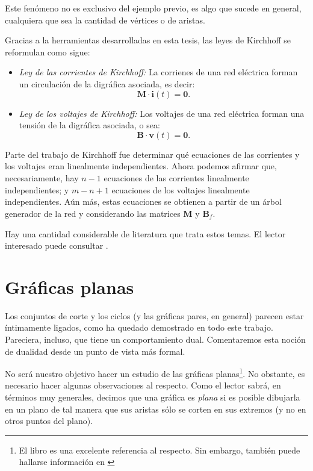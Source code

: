 Este fenómeno no es exclusivo del ejemplo previo, es algo que sucede en general, cualquiera que sea la cantidad de vértices o de aristas.

Gracias a la herramientas desarrolladas en esta tesis, las leyes de Kirchhoff se reformulan como sigue:

\begin{itemize}
    \item \textit{Ley de las corrientes de Kirchhoff:} La corrienes de una red eléctrica forman un circulación de la digráfica asociada, es decir: $$
    \mathbf{M}\cdot\mathbf{i}(t) = \mathbf{0}.$$
    
    \item \textit{Ley de los voltajes de Kirchhoff:} Los voltajes de una red eléctrica forman una tensión de la digráfica asociada, o sea: $$
    \mathbf{B}\cdot\mathbf{v}(t) = \mathbf{0}.$$
\end{itemize}


Parte del trabajo de Kirchhoff fue determinar qué ecuaciones de las corrientes y los voltajes eran linealmente independientes. Ahora podemos afirmar que, necesariamente, hay $n-1$ ecuaciones de las corrientes linealmente independientes; y $m -n +1$ ecuaciones de los voltajes linealmente independientes. Aún más, estas ecuaciones se obtienen a partir de un árbol generador de la red y considerando las matrices $\widehat{\mathbf{M}}$ y $\mathbf{B}_{f}$. 

Hay una cantidad considerable de literatura que trata estos temas. El lector interesado puede consultar \cite{Deo,Seshu,Slepian,Chen}.

\section{Gráficas planas}

Los conjuntos de corte y los ciclos (y las gráficas pares, en general) parecen estar íntimamente ligados, como ha quedado demostrado en todo este trabajo. Pareciera, incluso, que tiene un comportamiento dual. Comentaremos esta noción de dualidad desde un punto de vista más formal.

No será nuestro objetivo hacer un estudio de las gráficas planas\footnote{El libro \cite{Bondy} es una excelente referencia al respecto. Sin embargo, también puede hallarse información en \cite{Chen,Deo,Diestel,Seshu,Gross}}. No obstante, es necesario hacer algunas observaciones al respecto. Como el lector sabrá, en términos muy generales, decimos que una gráfica es \textit{plana} si es posible dibujarla en un plano de tal manera que sus aristas sólo se corten en sus extremos (y no en otros puntos del plano).

